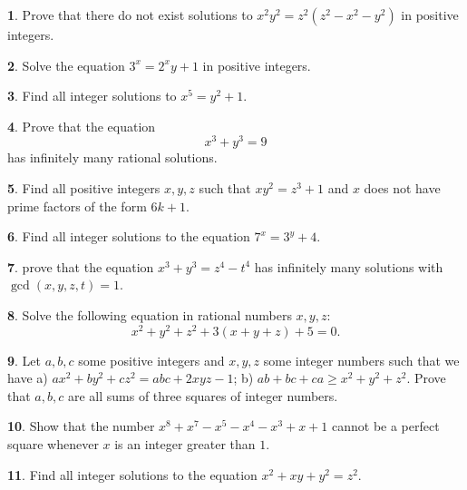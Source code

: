 \documentclass{article}
\theoremstyle{definition}
\newtheorem{p}{}
\begin{document}
	
	\begin{p}
		Prove that there do not exist solutions to $x^2y^2 = z^2(z^2-x^2-y^2)$ in positive integers.
	\end{p}
	
	
	\begin{p}
		Solve the equation $3^x=2^xy+1$ in positive integers.
	\end{p}
	
	
	\begin{p}
		Find all integer solutions to $x^5=y^2+1$.
	\end{p}
	
	
	\begin{p}
		Prove that the equation
		\[x^3+y^3=9\]
		has infinitely many rational solutions.
	\end{p}
	
	
	\begin{p}
		Find all positive integers $x,y,z$ such that $xy^2=z^3+1$ and $x$ does not have prime factors of the form $6k+1$.
	\end{p}
	
	
	\begin{p}
		Find all integer solutions to the equation $7^x=3^y+4$. 
	\end{p}
	
	
	\begin{p}
		prove that the equation $x^3+y^3=z^4-t^4$ has infinitely many solutions  with $\gcd(x,y,z,t)=1$.
	\end{p}
	
	
	
	\begin{p}
		Solve the following equation in rational numbers $x,y,z$:
		\[x^2+y^2+z^2+3(x+y+z)+5=0.\]
	\end{p}
	
	
	
	
	\begin{p}
		Let $ a,b,c$ some positive integers and $ x,y,z$ some integer numbers such that we have 
		a) $ax^2+by^2+cz^2= abc+2xyz-1$;
		b) $ab+bc+ca\geq x^2+y^2+z^2$.
		Prove that $ a,b,c$ are all sums of three squares of integer numbers.
	\end{p}
	
	\begin{p}
		Show that the number $x^8 + x^7 - x^5 - x^4 - x^3 + x + 1$ cannot be a perfect square whenever $x$ is an integer greater than $1$.
	\end{p}
	
	
	
	
	\begin{p}
		Find all integer solutions to the equation $x^2+xy+y^2=z^2$.
	\end{p}
	
\end{document}
